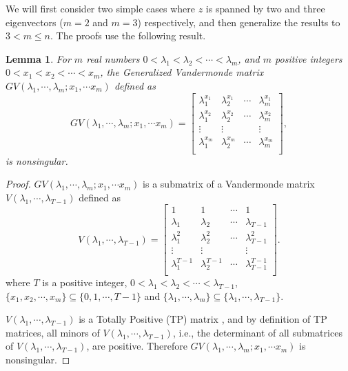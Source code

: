 \documentclass[journal]{IEEEtran}
\newtheorem{lem}{\bf{Lemma}}
\begin{document}
We will first consider two simple cases where $z$ is spanned by two and three eigenvectors ($m = 2$ and $m =3 $) respectively, and then generalize the results to $3 < m \leq n$. The proofs use the following result.

\begin{lem} \label{lem:gv}
For $m$ real numbers $0< \lambda_1 < \lambda_2 < \cdots < \lambda_m$, and $m$ positive integers $0< x_1 < x_2 < \cdots < x_m$, the Generalized Vandermonde matrix $GV(\lambda_1, \cdots, \lambda_m; x_1, \cdots x_m)$ defined as
\begin{equation}
GV(\lambda_1, \cdots, \lambda_m; x_1, \cdots x_m) = 
	\begin{bmatrix} \lambda_1^{x_1} & \lambda_2^{x_1} & \cdots & \lambda_m^{x_1} \\
			\lambda_1^{x_2} & \lambda_2^{x_2} & \cdots & \lambda_m^{x_2} \\
			\vdots & \vdots  & & \vdots\\
			\lambda_1^{x_m} & \lambda_2^{x_m} & \cdots & \lambda_m^{x_m} \\
	\end{bmatrix},
	\end{equation}\nonumber
is nonsingular.
\end{lem}
 
\begin{proof}
$GV(\lambda_1, \cdots, \lambda_m; x_1, \cdots x_m)$ is a submatrix of a Vandermonde matrix $V(\lambda_1, \cdots, \lambda_{T-1})$ defined as
\begin{equation}
V(\lambda_1, \cdots, \lambda_{T-1}) = 
	\begin{bmatrix}1 & 1 & \cdots & 1 \\
			\lambda_1 & \lambda_2 & \cdots & \lambda_{T-1} \\
			\lambda_1^{2} & \lambda_2^{2} & \cdots & \lambda_{T-1}^{2} \\
			\vdots & \vdots  & & \vdots\\
			\lambda_1^{T-1} & \lambda_2^{T-1} & \cdots & \lambda_{T-1}^{T-1} \\
	\end{bmatrix}.
	\end{equation}\nonumber
where $T$ is a positive integer, $0< \lambda_1 < \lambda_2 < \cdots < \lambda_{T-1}$, $\{x_1, x_2, \cdots, x_m\} \subseteq \{0, 1, \cdots, T-1\}$ and $\{ \lambda_1,\cdots, \lambda_m\} \subseteq \{ \lambda_1,\cdots, \lambda_{T-1}\} $.

$V(\lambda_1, \cdots, \lambda_{T-1})$ is a Totally Positive (TP) matrix \cite{fallat2011tnm}, and by definition of TP matrices, all minors of $V(\lambda_1, \cdots, \lambda_{T-1})$, i.e., the determinant of all submatrices of $V(\lambda_1, \cdots, \lambda_{T-1})$, are positive. Therefore $GV(\lambda_1, \cdots, \lambda_m; x_1, \cdots x_m) $ is nonsingular.
\end{proof}
\end{document}
